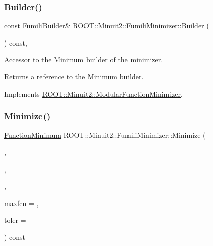 \subsubsection{\texorpdfstring{Builder()}{Builder()}\hspace{0.1cm}{\footnotesize\ttfamily [2/2]}}
{\footnotesize\ttfamily const \mbox{\hyperlink{classROOT_1_1Minuit2_1_1FumiliBuilder}{Fumili\+Builder}}\& R\+O\+O\+T\+::\+Minuit2\+::\+Fumili\+Minimizer\+::\+Builder (\begin{DoxyParamCaption}{ }\end{DoxyParamCaption}) const\hspace{0.3cm}{\ttfamily [inline]}, {\ttfamily [virtual]}}

Accessor to the Minimum builder of the minimizer.

\begin{DoxyReturn}{Returns}
a reference to the Minimum builder. 
\end{DoxyReturn}


Implements \mbox{\hyperlink{classROOT_1_1Minuit2_1_1ModularFunctionMinimizer_a13e98551cf14e927c61e1e34ecf8ba8b}{R\+O\+O\+T\+::\+Minuit2\+::\+Modular\+Function\+Minimizer}}.

\mbox{\label{classROOT_1_1Minuit2_1_1FumiliMinimizer_a3da0ec7b2ba7f876809f72d2f3054eec}} 
\subsubsection{\texorpdfstring{Minimize()}{Minimize()}\hspace{0.1cm}{\footnotesize\ttfamily [1/22]}}
{\footnotesize\ttfamily \mbox{\hyperlink{classROOT_1_1Minuit2_1_1FunctionMinimum}{Function\+Minimum}} R\+O\+O\+T\+::\+Minuit2\+::\+Fumili\+Minimizer\+::\+Minimize (\begin{DoxyParamCaption}\item[{const \mbox{\hyperlink{classROOT_1_1Minuit2_1_1FCNBase}{F\+C\+N\+Base}} \&}]{,  }\item[{const \mbox{\hyperlink{classROOT_1_1Minuit2_1_1MnUserParameterState}{Mn\+User\+Parameter\+State}} \&}]{,  }\item[{const \mbox{\hyperlink{classROOT_1_1Minuit2_1_1MnStrategy}{Mn\+Strategy}} \&}]{,  }\item[{unsigned int}]{maxfcn = {},  }\item[{double}]{toler = {} }\end{DoxyParamCaption}) const\hspace{0.3cm}{\ttfamily [virtual]}}



